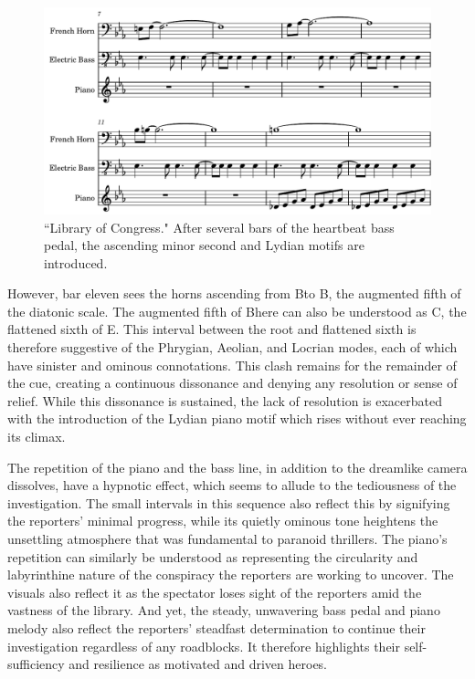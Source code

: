 \begin{figure}
    \centering
    \includegraphics[width=0.75\linewidth]{img/president-library-cue.pdf}
    \caption{``Library of Congress." After several bars of the heartbeat bass pedal, the ascending minor second and Lydian motifs are introduced.}
    \label{fig:president-library-cue}
\end{figure}
However, bar eleven sees the horns ascending from B\flat to B\natural, the augmented fifth of the diatonic scale.
The augmented fifth of B\natural here can also be understood as C\flat, the flattened sixth of E\flat.
This interval between the root and flattened sixth is therefore suggestive of the Phrygian, Aeolian, and Locrian modes, each of which have sinister and ominous connotations.
This clash remains for the remainder of the cue, creating a continuous dissonance and denying any resolution or sense of relief.
While this dissonance is sustained, the lack of resolution is exacerbated with the introduction of the Lydian piano motif which rises without ever reaching its climax.

The repetition of the piano and the bass line, in addition to the dreamlike camera dissolves, have a hypnotic effect, which seems to allude to the tediousness of the investigation.
The small intervals in this sequence also reflect this by signifying the reporters' minimal progress, while its quietly ominous tone heightens the unsettling atmosphere that was fundamental to paranoid thrillers.
The piano's repetition can similarly be understood as representing the circularity and labyrinthine nature of the conspiracy the reporters are working to uncover.
The visuals also reflect it as the spectator loses sight of the reporters amid the vastness of the library.
And yet, the steady, unwavering bass pedal and piano melody also reflect the reporters' steadfast determination to continue their investigation regardless of any roadblocks.
It therefore highlights their self-sufficiency and resilience as motivated and driven heroes.

